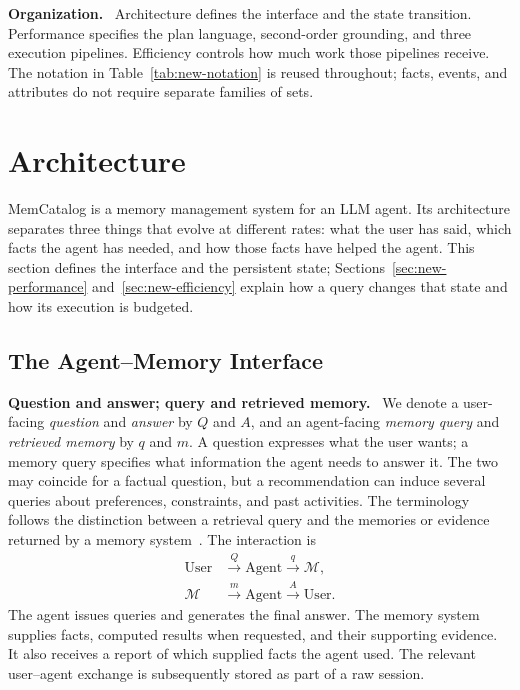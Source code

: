 \documentclass[10pt,twocolumn]{article}
\newcommand{\sys}{MemCatalog}
\newcommand{\Mm}{\mathcal{M}}
\newcommand{\runin}[1]{\smallskip\noindent\textbf{#1.}\ }
\begin{document}
\runin{Organization}
Architecture defines the interface and the state transition.
Performance specifies the plan language, second-order grounding,
and three execution pipelines. Efficiency controls how much work those
pipelines receive. The notation in Table~\ref{tab:new-notation} is reused
throughout; facts, events, and attributes do not require separate
families of sets.

\section{Architecture}
\label{sec:new-architecture}

\sys{} is a memory management system for an LLM agent. Its architecture
separates three things that evolve at different rates: what the user has
said, which facts the agent has needed, and how those facts have helped
the agent. This section defines the interface and the persistent state;
Sections~\ref{sec:new-performance} and~\ref{sec:new-efficiency} explain
how a query changes that state and how its execution is budgeted.

\subsection{The Agent--Memory Interface}
\label{subsec:new-interface}

\runin{Question and answer; query and retrieved memory}
We denote a user-facing \emph{question} and \emph{answer} by $Q$ and $A$,
and an agent-facing \emph{memory query} and \emph{retrieved memory} by
$q$ and $m$. A question expresses what the user wants; a memory query
specifies what information the agent needs to answer it. The two may
coincide for a factual question, but a recommendation can induce several
queries about preferences, constraints, and past activities. The
terminology follows the distinction between a retrieval query and the
memories or evidence returned by a memory system~\cite{mem0,memr3}.
The interaction is
\begin{equation}
\label{eq:new-interface}
\begin{aligned}
\mathrm{User}&\xrightarrow{\ Q\ }\mathrm{Agent}
                    \xrightarrow{\ q\ }\Mm,\\
\Mm&\xrightarrow{\ m\ }\mathrm{Agent}
                    \xrightarrow{\ A\ }\mathrm{User}.
\end{aligned}
\end{equation}
The agent issues queries and generates the final answer. The memory
system supplies facts, computed results when requested, and their
supporting evidence. It also receives a report of which supplied facts
the agent used. The relevant user--agent exchange is subsequently stored
as part of a raw session.
\end{document}
